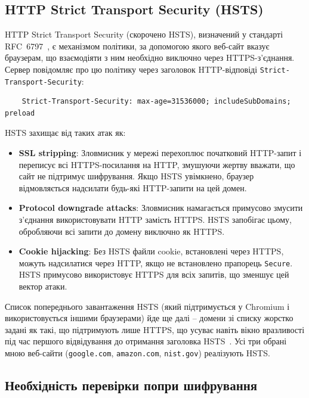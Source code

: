 \subsection{HTTP Strict Transport Security (HSTS)}

HTTP Strict Transport Security (скорочено HSTS), визначений у стандарті RFC~6797~\cite{rfc6797}, є механізмом політики, за 
допомогою якого веб-сайт вказує браузерам, що взаємодіяти з ним необхідно виключно через HTTPS-з'єднання. Сервер 
повідомляє про цю політику через заголовок HTTP-відповіді \texttt{Strict-Transport-Security}:
\begin{verbatim}
    Strict-Transport-Security: max-age=31536000; includeSubDomains; preload
\end{verbatim}

HSTS захищає від таких атак як:
\begin{itemize}
    \item \textbf{SSL stripping}: Зловмисник у мережі перехоплює початковий HTTP-запит і переписує всі HTTPS-посилання 
        на HTTP, змушуючи жертву вважати, що сайт не підтримує шифрування. Якщо HSTS увімкнено, браузер відмовляється 
        надсилати будь-які HTTP-запити на цей домен.
    \item \textbf{Protocol downgrade attacks}: Зловмисник намагається примусово змусити з'єднання використовувати HTTP 
        замість HTTPS. HSTS запобігає цьому, обробляючи всі запити до домену виключно як HTTPS.
    \item \textbf{Cookie hijacking}: Без HSTS файли cookie, встановлені через HTTPS, можуть надсилатися через 
        HTTP, якщо не встановлено прапорець \texttt{Secure}. HSTS примусово використовує HTTPS для всіх запитів, 
        що зменшує цей вектор атаки.
\end{itemize}

Список попереднього завантаження HSTS (який підтримується у Chromium і використовується іншими браузерами) йде ще 
далі -- домени зі списку жорстко задані як такі, що підтримують лише HTTPS, що усуває навіть вікно вразливості під 
час першого відвідування до отримання заголовка HSTS~\cite{rfc6797}. Усі три обрані мною веб-сайти (\texttt{google.com}, 
\texttt{amazon.com}, \texttt{nist.gov}) реалізують HSTS.

\subsection{Необхідність перевірки попри шифрування}

